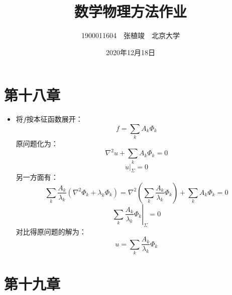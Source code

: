 \documentclass[a4paper,fontset=windows]{ctexart}
\begin{document}
\title{\textbf{数学物理方法作业}}
\author{1900011604\ \ 张植竣\ \ 北京大学}
\date{2020年12月18日}
\maketitle

\section*{第十八章}
\bigskip

\begin{itemize}

\item[4.]
将$f$按本征函数展开：
\[
f = \sum_k{A_k\varPhi_k}
\]
原问题化为：
\[
\nabla^2u + \sum_k{A_k\varPhi_k} = 0
\]
\[
u\big|_{\varSigma} = 0
\]
另一方面有：
\[
\sum_k{\frac{A_k}{\lambda_k}\left(\nabla^2\varPhi_k + \lambda_k\varPhi_k\right)} = \nabla^2\left(\sum_k{\frac{A_k}{\lambda_k}\varPhi_k}\right) + \sum_k{A_k\varPhi_k} = 0
\]
\[
\left.\sum_k{\frac{A_k}{\lambda_k}\varPhi_k}\right|_{\varSigma} = 0
\]
对比得原问题的解为：
\[
u = \sum_k{\frac{A_k}{\lambda_k}\varPhi_k}
\]

\end{itemize}

\newpage
\section*{第十九章}
\bigskip
\end{document}
